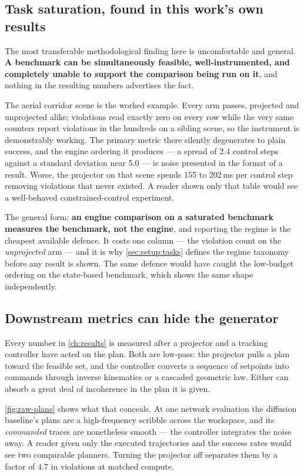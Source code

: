 \subsection*{Task saturation, found in this work's own results}

The most transferable methodological finding here is uncomfortable and general.
\textbf{A benchmark can be simultaneously feasible, well-instrumented, and completely unable to
support the comparison being run on it}, and nothing in the resulting numbers advertises the fact.

The aerial corridor scene is the worked example. Every arm passes, projected and unprojected alike;
violations read exactly zero on every row while the very same counters report violations in the
hundreds on a sibling scene, so the instrument is demonstrably working. The primary metric there
silently degenerates to plain success, and the engine ordering it produces --- a spread of 2.4
control steps against a standard deviation near 5.0 --- is noise presented in the format of a result.
Worse, the projector on that scene spends 155 to 202\,ms per control step removing violations that
never existed. A reader shown only that table would see a well-behaved constrained-control
experiment.

The general form: \textbf{an engine comparison on a saturated benchmark measures the benchmark, not
the engine}, and reporting the regime is the cheapest available defence. It costs one column --- the
violation count on the \emph{unprojected} arm --- and it is why \autoref{sec:setup:tasks} defines
the regime taxonomy before any result is shown. The same defence would have caught the low-budget
ordering on the state-based benchmark, which shows the same shape independently.

\subsection*{Downstream metrics can hide the generator}

Every number in \autoref{ch:results} is measured after a projector and a tracking controller have
acted on the plan. Both are low-pass: the projector pulls a plan toward the feasible set, and the
controller converts a sequence of setpoints into commands through inverse kinematics or a cascaded
geometric law. Either can absorb a great deal of incoherence in the plan it is given.

\autoref{fig:raw-plans} shows what that conceals. At one network evaluation the diffusion baseline's
plans are a high-frequency scribble across the workspace, and its \emph{commanded} traces are
nonetheless smooth --- the controller integrates the noise away. A reader given only the executed
trajectories and the success rates would see two comparable planners. Turning the projector off
separates them by a factor of $4.7$ in violations at matched compute.

